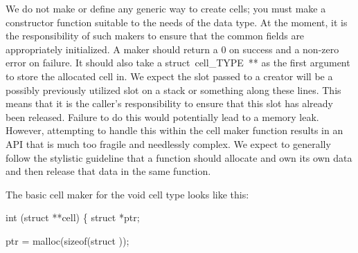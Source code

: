\documentclass{article}%
\begin{document}
\nwenddocs{}\endmoddef\nwstartdeflinemarkup{}\nwenddeflinemarkup
{}
\eatline
{}\nwendcode{}\nwdocspar
We do not make or define any generic way
to create cells; 
you must make a constructor function suitable
to the needs of the data type.
At the moment, it is the responsibility of such makers
to ensure that the common fields are 
appropriately initialized.
A maker should return a {\Tt{}0\nwendquote} on success
and a non-zero error on failure.
It should also take a {\Tt{}struct\ cell{\_}TYPE\ **\nwendquote}
as the first argument to store the allocated cell in.
We expect the slot passed to a creator
will be a possibly previously utilized slot
on a stack or something along these lines.
This means that it is the caller's responsibility
to ensure that this slot has already been released.
Failure to do this would potentially lead to a memory leak.
However, attempting to handle this within the cell maker function
results in an API that is much too fragile and needlessly complex.
We expect to generally follow the stylistic guideline 
that a function should allocate and own its own data
and then release that data in the same function.

The basic cell maker for the {\Tt{}void\nwendquote} cell type looks like this:

\nwenddocs{}\endmoddef\nwstartdeflinemarkup{}\nwenddeflinemarkup
{} int
(struct  **cell)
\{
        struct  *ptr;

        ptr = malloc(sizeof(struct ));
\end{document}
